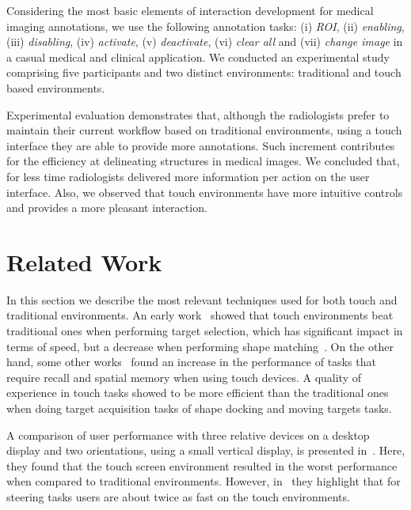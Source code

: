 \documentclass{sigchi}
\begin{document}
Considering the most basic elements of interaction development for medical imaging annotations, we use the following annotation tasks: (i) \textit{ROI}, (ii) \textit{enabling}, (iii) \textit{disabling}, (iv) \textit{activate}, (v) \textit{deactivate}, (vi) \textit{clear all} and (vii) \textit{change image} in a casual medical and clinical application. We conducted an experimental study comprising five participants and two distinct environments: traditional and touch based environments.

Experimental evaluation demonstrates that, although the radiologists prefer to maintain their current workflow based on traditional environments, using a touch interface they are able to provide more annotations. Such increment contributes for the efficiency at delineating structures in medical images. We concluded that, for less time radiologists delivered more information per action on the user interface. Also, we observed that touch environments have more intuitive controls and provides a more pleasant interaction.

\section{Related Work}

In this section we describe the most relevant techniques used for both touch and traditional environments. 
An early work~\cite{shanis2003comparison} showed that touch environments beat traditional ones when performing target selection, which has significant impact in terms of speed, but a decrease when performing shape matching~\cite{forlines2007direct}. On the other hand, some other works~\cite{tan2002kinesthetic, wallace1972spatial, nacher2016kindergarten} found an increase in the performance of tasks that require recall and spatial memory when using touch devices. A quality of experience in touch tasks showed to be more efficient than the traditional ones when doing target acquisition tasks of shape docking and moving targets tasks.

A comparison of user performance with three relative devices on a desktop display and two  orientations, using a small vertical display, is presented in~\cite{meyer1994device}. Here, they found that the touch screen environment resulted in the worst performance  when compared to traditional environments. However, in~\cite{accot1997beyond} they highlight that for steering tasks users are about twice as fast on the touch environments.
\end{document}
